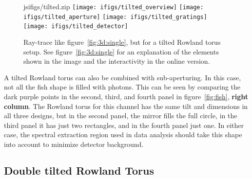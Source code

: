 \documentclass[linenumbers]{aastex631}
\begin{document}
\begin{figure}
    \begin{interactive}{js}{ifigs/tilted.zip}
    \texttt{[image: ifigs/tilted\_overview]}
    \texttt{[image: ifigs/tilted\_aperture]}
    \texttt{[image: ifigs/tilted\_gratings]}
    \texttt{[image: ifigs/tilted\_detector]}
    \end{interactive}
  \caption{Ray-trace like figure~\ref{fig:3d:single}, but for a tilted Rowland torus setup. See figure~\ref{fig:3d:single} for an explanation of the elements shown in the image and the interactivity in the online version.
  }
  \label{fig:3d:tilted}
  \end{figure}

A tilted Rowland torus can also be combined with sub-aperturing. %
In this case, not all the fish shape is filled with photons. This can be seen by comparing the dark purple points in the second, third, and fourth panel in figure~\ref{fig:fish}, \textbf{right column}. The Rowland torus for this channel has the same tilt and dimensions in all three designs, but in the second panel, the mirror fills the full circle, in the third panel it has just two rectangles, and in the fourth panel just one. In either case, the spectral extraction region used in data analysis should take this shape into account to minimize detector background.

\subsection{Double tilted Rowland Torus}


\end{document}
